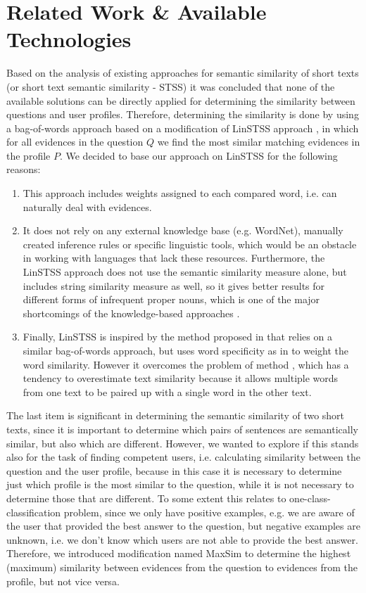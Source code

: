 \documentclass[conference]{IEEEtran}
\begin{document}
\section{Related Work \& Available Technologies}
\label{sec:relatedwork}
Based on the analysis of existing approaches for semantic similarity of short texts (or short text semantic similarity - STSS) it was concluded that none of the available solutions can be directly applied for determining the similarity between questions and user profiles. Therefore, determining the similarity is done by using a bag-of-words approach based on a modification of LinSTSS approach \cite{bib:LinSTSS}, in which for all evidences in the question $Q$ we find the most similar matching evidences in the profile $P$. We decided to base our approach on LinSTSS for the following reasons:
\begin{enumerate}
	\item This approach includes weights assigned to each compared word, i.e. can naturally deal with evidences.
	\item It does not rely on any external knowledge base (e.g. WordNet), manually created inference rules or specific linguistic tools, which would be an obstacle in working with languages that lack these resources. Furthermore, the LinSTSS approach does not use the semantic similarity measure alone, but includes string similarity measure as well, so it gives better results for different forms of infrequent proper nouns, which is one of the major shortcomings of the knowledge-based approaches \cite{bib:JITA}.
	\item Finally, LinSTSS is inspired by the method proposed in \cite{bib:1} that relies on a similar bag-of-words approach, but uses word specificity as in \cite{bib:2} to weight the word similarity. However it overcomes the problem of method \cite{bib:2}, which has a tendency to overestimate text similarity because it allows multiple words from one text to be paired up with a single word in the other text.
\end{enumerate}	
The last item is significant in determining the semantic similarity of two short texts, since it is important to determine which pairs of sentences are semantically similar, but also which are different. However, we wanted to explore if this stands also for the task of finding competent users, i.e. calculating similarity between the question and the user profile, because in this case it is necessary to determine just which profile is the most similar to the question, while it is not necessary to determine those that are different. To some extent this relates to one-class-classification problem, since we only have positive examples, e.g. we are aware of the user that provided the best answer to the question, but negative examples are unknown, i.e. we don’t know which users are not able to provide the best answer. Therefore, we introduced modification named MaxSim to determine the highest (maximum) similarity between evidences from the question to evidences from the profile, but not vice versa.
\end{document}
